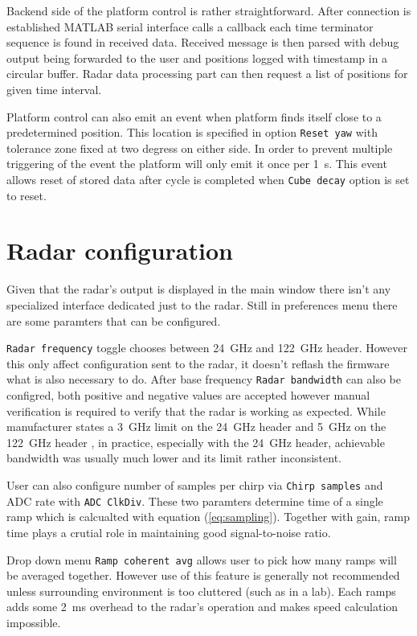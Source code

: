 Backend side of the platform control is rather straightforward.
After connection is established MATLAB serial interface calls a callback each time terminator sequence is found in received data.
Received message is then parsed with debug output being forwarded to the user and positions logged with timestamp in a circular buffer.
Radar data processing part can then request a list of positions for given time interval.

Platform control can also emit an event when platform finds itself close to a predetermined position.
This location is specified in option \texttt{Reset yaw} with tolerance zone fixed at two degress on either side.
In order to prevent multiple triggering of the event the platform will only emit it once per 1~s.
This event allows reset of stored data after cycle is completed when \texttt{Cube decay} option is set to reset.

\section{Radar configuration}

Given that the radar's output is displayed in the main window there isn't any specialized interface dedicated just to the radar.
Still in preferences menu there are some paramters that can be configured.

\texttt{Radar frequency} toggle chooses between 24~GHz and 122~GHz header.
However this only affect configuration sent to the radar, it doesn't reflash the firmware what is also necessary to do.
After base frequency \texttt{Radar bandwidth} can also be configred, both positive and negative values are accepted however manual verification is required to verify that the radar is working as expected.
While manufacturer states a 3~GHz limit on the 24~GHz header and 5~GHz on the 122~GHz header \cite{sidarPRO}, in practice, especially with the 24~GHz header, achievable bandwidth was usually much lower and its limit rather inconsistent.

User can also configure number of samples per chirp via \texttt{Chirp samples} and ADC rate with \texttt{ADC ClkDiv}.
These two paramters determine time of a single ramp which is calcualted with equation (\ref{eq:sampling}).
Together with gain, ramp time plays a crutial role in maintaining good signal-to-noise ratio.

Drop down menu \texttt{Ramp coherent avg} allows user to pick how many ramps will be averaged together.
However use of this feature is generally not recommended unless surrounding environment is too cluttered (such as in a lab).
Each ramps adds some 2~ms overhead to the radar's operation and makes speed calculation impossible.


